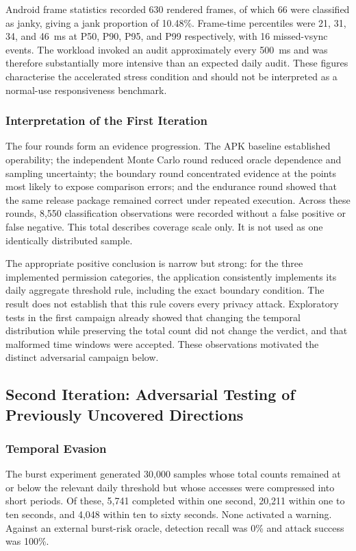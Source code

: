 Android frame statistics recorded 630 rendered frames, of which 66 were classified as janky, giving a jank proportion of 10.48\%. Frame-time percentiles were 21, 31, 34, and 46~ms at P50, P90, P95, and P99 respectively, with 16 missed-vsync events. The workload invoked an audit approximately every 500~ms and was therefore substantially more intensive than an expected daily audit. These figures characterise the accelerated stress condition and should not be interpreted as a normal-use responsiveness benchmark.

\subsubsection{Interpretation of the First Iteration}

The four rounds form an evidence progression. The APK baseline established operability; the independent Monte Carlo round reduced oracle dependence and sampling uncertainty; the boundary round concentrated evidence at the points most likely to expose comparison errors; and the endurance round showed that the same release package remained correct under repeated execution. Across these rounds, 8,550 classification observations were recorded without a false positive or false negative. This total describes coverage scale only. It is not used as one identically distributed sample.

The appropriate positive conclusion is narrow but strong: for the three implemented permission categories, the application consistently implements its daily aggregate threshold rule, including the exact boundary condition. The result does not establish that this rule covers every privacy attack. Exploratory tests in the first campaign already showed that changing the temporal distribution while preserving the total count did not change the verdict, and that malformed time windows were accepted. These observations motivated the distinct adversarial campaign below.

\subsection{Second Iteration: Adversarial Testing of Previously Uncovered Directions}

\subsubsection{Temporal Evasion}

The burst experiment generated 30,000 samples whose total counts remained at or below the relevant daily threshold but whose accesses were compressed into short periods. Of these, 5,741 completed within one second, 20,211 within one to ten seconds, and 4,048 within ten to sixty seconds. None activated a warning. Against an external burst-risk oracle, detection recall was 0\% and attack success was 100\%.

